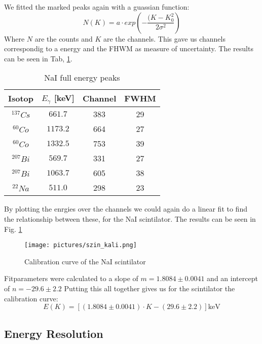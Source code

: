 We fitted the marked peaks again with a guassian function:
\begin{equation}
N(K) = a \cdot exp \left( - \frac{(K - K_{0}^{2}}{2 \sigma ^{2}} \right)
\end {equation}
Where $N$ are the counts and $K$ are the channels.
This gave us channels correspondig to a energy and the FHWM as measure of uncertainty.
The results can be seen in Tab, \ref{szin_peaks}.

\begin{table}[h]
\centering
\begin{tabular}{c |c | c |c}
\hline
Isotop & $E_{\gamma}$ [keV]  & Channel & FWHM \\
\hline
$^{137}Cs$ & $661.7$ & 383 & 29 \\
$^{60}Co$ & $1173.2$ & 664 & 27 \\
$^{60}Co$ & $1332.5$ & 753 & 39 \\
$^{207}Bi$ & $569.7$   & 331 & 27 \\
$^{207}Bi$ & $1063.7$ & 605 & 38 \\
$^{22}Na$ & $511.0$   & 298 & 23 \\
\hline
\end{tabular}
\caption{NaI full energy peaks}
\label{szin_peaks}
\end{table}
By plotting the enrgies over the channels we could again do a linear fit to find the relationship between these, for the NaI scintilator.
The results can be seen in Fig. \ref{szin_kali}

\begin{figure}[h]
  \texttt{[image: pictures/szin\_kali.png]}
  \caption{Calibration curve of the NaI scintilator}
  \label{szin_kali}
\end{figure}
Fitparameters were calculated to a slope of $m = 1.8084 \pm 0.0041$ and an intercept of $n = -29.6 \pm 2.2$
Putting this all together gives us for the scintilator the calibration curve:
\begin{equation}
E(K) = [(1.8084 \pm 0.0041) \cdot K - (29.6 \pm 2.2)]  \text{keV}
\end {equation}

\clearpage

\subsection{Energy Resolution}


